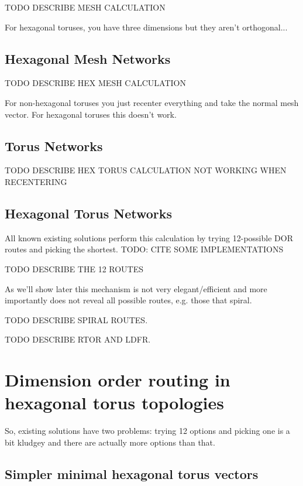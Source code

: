 			TODO DESCRIBE MESH CALCULATION
			
			For hexagonal toruses, you have three dimensions but they aren't
			orthogonal... \cite{patel15}
		
		\subsection{Hexagonal Mesh Networks}
			
			TODO DESCRIBE HEX MESH CALCULATION
			
			For non-hexagonal toruses you just recenter everything and take the normal
			mesh vector. For hexagonal toruses this doesn't work.
		
		\subsection{Torus Networks}
			
			TODO DESCRIBE HEX TORUS CALCULATION NOT WORKING WHEN RECENTERING
		
		\subsection{Hexagonal Torus Networks}
		
			All known existing solutions perform this calculation by trying 12-possible
			DOR routes and picking the shortest. TODO: CITE SOME IMPLEMENTATIONS
			
			TODO DESCRIBE THE 12 ROUTES
			
			As we'll show later this mechanism is not very elegant/efficient and more
			importantly does not reveal all possible routes, e.g. those that spiral.
			
			TODO DESCRIBE SPIRAL ROUTES.
			
			TODO DESCRIBE RTOR AND LDFR.
		
	\section{Dimension order routing in hexagonal torus topologies}
		
		So, existing solutions have two problems: trying 12 options and picking one
		is a bit kludgey and there are actually more options than that.
		
		\subsection{Simpler minimal hexagonal torus vectors}
			
